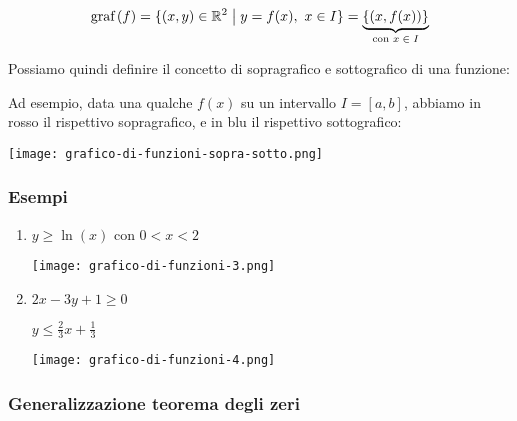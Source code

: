 \[\text{graf}\left(f\right) = \{(x,y) \in \mathbb{R}^2 \;\big|\; y=f(x),\ x \in I \} = \underbrace{\{(x,f(x))\}}_{\text{con \(x \in I\)}}\]

Possiamo quindi definire il concetto di sopragrafico e sottografico di una funzione:



Ad esempio, data una qualche \(f(x)\) su un intervallo \(I=[a,b]\), abbiamo in rosso il rispettivo sopragrafico, e in blu il rispettivo sottografico:

\medskip
\texttt{[image: grafico-di-funzioni-sopra-sotto.png]}

\filbreak{}

\subsubsection*{Esempi}

\begin{enumerate}
    \item \(y \ge \ln(x)\) con \(0<x<2\)

          \medskip
          \texttt{[image: grafico-di-funzioni-3.png]}

    \item \(2x - 3y +1 \ge 0\)

          \(y \le \frac{2}{3}x + \frac{1}{3}\)

          \medskip
          \texttt{[image: grafico-di-funzioni-4.png]}
\end{enumerate}

\filbreak{}
\subsubsection{Generalizzazione teorema degli zeri}

